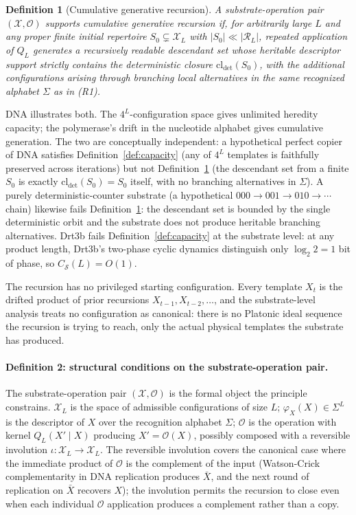 \documentclass[aps,prx,reprint,amsmath,amssymb,floatfix,superscriptaddress,nofootinbib]{revtex4-2}
\theoremstyle{plain-thm}
\theoremstyle{definition-thm}
\newtheorem{definition}[theorem]{Definition}
\newcommand{\Csub}{C_{\mathcal{S}}}
\newcommand{\descX}{\varphi_X}
\newcommand{\Xset}{\mathcal{X}}
\newcommand{\Op}{\mathcal{O}}
\newcommand{\Reach}{\mathcal{R}}
\begin{document}
\begin{definition}[Cumulative generative recursion]
\label{def:generation}
A substrate-operation pair $(\Xset, \Op)$ supports \textnormal{cumulative generative recursion} if, for arbitrarily large $L$ and any proper finite initial repertoire $S_0 \subsetneq \Xset_L$ with $|S_0| \ll |\Reach_L|$, repeated application of $Q_L$ generates a recursively readable descendant set whose heritable descriptor support strictly contains the deterministic closure $\mathrm{cl}_{\det}(S_0)$, with the additional configurations arising through branching local alternatives in the same recognized alphabet $\Sigma$ as in (R1).
\end{definition}

DNA illustrates both. The $4^L$-configuration space gives unlimited heredity capacity; the polymerase's drift in the nucleotide alphabet gives cumulative generation. The two are conceptually independent: a hypothetical perfect copier of DNA satisfies Definition~\ref{def:capacity} (any of $4^L$ templates is faithfully preserved across iterations) but not Definition~\ref{def:generation} (the descendant set from a finite $S_0$ is exactly $\mathrm{cl}_{\det}(S_0) = S_0$ itself, with no branching alternatives in $\Sigma$). A purely deterministic-counter substrate (a hypothetical $000 \to 001 \to 010 \to \cdots$ chain) likewise fails Definition~\ref{def:generation}: the descendant set is bounded by the single deterministic orbit and the substrate does not produce heritable branching alternatives. Drt3b fails Definition~\ref{def:capacity} at the substrate level: at any product length, Drt3b's two-phase cyclic dynamics distinguish only $\log_2 2 = 1$ bit of phase, so $\Csub(L) = O(1)$.

The recursion has no privileged starting configuration. Every template $X_t$ is the drifted product of prior recursions $X_{t-1}, X_{t-2}, \ldots$, and the substrate-level analysis treats no configuration as canonical: there is no Platonic ideal sequence the recursion is trying to reach, only the actual physical templates the substrate has produced.

\paragraph{Definition 2: structural conditions on the substrate-operation pair.}

The substrate-operation pair $(\Xset, \Op)$ is the formal object the principle constrains. $\Xset_L$ is the space of admissible configurations of size $L$; $\descX(X) \in \Sigma^L$ is the descriptor of $X$ over the recognition alphabet $\Sigma$; $\Op$ is the operation with kernel $Q_L(X' \mid X)$ producing $X' = \Op(X)$, possibly composed with a reversible involution $\iota: \Xset_L \to \Xset_L$. The reversible involution covers the canonical case where the immediate product of $\Op$ is the complement of the input (Watson-Crick complementarity in DNA replication produces $\bar{X}$, and the next round of replication on $\bar{X}$ recovers $X$); the involution permits the recursion to close even when each individual $\Op$ application produces a complement rather than a copy.
\end{document}
